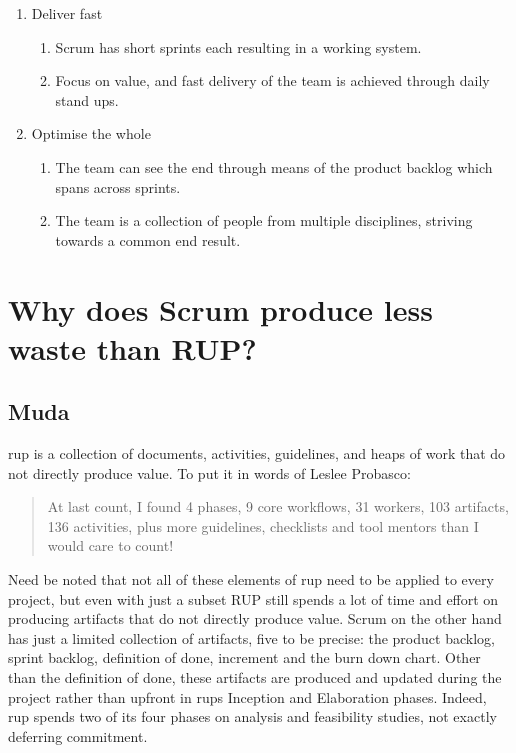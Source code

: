 \begin{enumerate}
\begin{enumerate}
    \end{enumerate}
    \item Deliver fast
    \begin{enumerate}
        \item Scrum has short sprints each resulting in a working system.
        \item Focus on value, and fast delivery of the team is achieved through daily stand ups.
    \end{enumerate}
    \item Optimise the whole
    \begin{enumerate}
        \item The team can see the end through means of the product backlog which spans across sprints.
        \item The team is a collection of people from multiple disciplines, striving towards a common end result.
    \end{enumerate}
\end{enumerate}

\section{Why does Scrum produce less waste than RUP?}
\subsection{Muda}
\ac{rup} is a collection of documents, activities, guidelines, and heaps of work that do not directly produce value. To put it in words of Leslee Probasco:~\citep{probasco2000ten}

\begin{quote}
At last count, I found 4 phases, 9 core workflows, 31 workers, 103 artifacts, 136 activities, plus more guidelines, checklists and tool mentors than I would care to count!
\end{quote}

Need be noted that not all of these elements of \ac{rup} need to be applied to every project, but even with just a subset RUP still spends a lot of time and effort on producing artifacts that do not directly produce value. Scrum on the other hand has just a limited collection of artifacts, five to be precise: the product backlog, sprint backlog, definition of done, increment and the burn down chart. Other than the definition of done, these artifacts are produced and updated during the project rather than upfront in \ac{rup}s Inception and Elaboration phases. Indeed, \ac{rup} spends two of its four phases on analysis and feasibility studies, not exactly deferring commitment.

